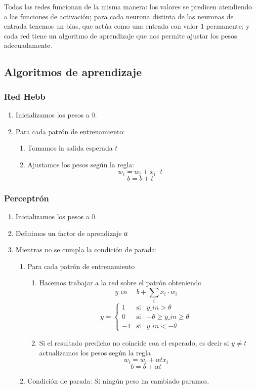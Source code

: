 Todas las redes funcionan de la misma manera: los valores se predicen atendiendo a las funciones de activación; para cada neurona distinta de las neuronas de entrada tenemos un bias, que actúa como una entrada con valor 1 permanente; y cada red tiene un algoritmo de aprendizaje que nos permite ajustar los pesos adecuadamente.

\subsection{Algoritmos de aprendizaje}
\subsubsection{Red Hebb}
\begin{enumerate}
\item Inicializamos los pesos a 0.
\item Para cada patrón de entrenamiento:
\begin{enumerate}
\item Tomamos la salida esperada $t$
\item Ajustamos los pesos según la regla:
\[w_i = w_i + x_i\cdot t\]
\[b = b + t\]
\end{enumerate}
\end{enumerate}

\subsubsection{Perceptrón}
\begin{enumerate}
\item Inicializamos los pesos a 0.
\item Definimos un factor de aprendizaje α
\item Mientras no se cumpla la condición de parada:
\begin{enumerate}
\item Para cada patrón de entrenamiento
\begin{enumerate}
\item Hacemos trabajar a la red sobre el patrón obteniendo
\[y\_in = b + \sum_i x_i\cdot w_i\]
\[y = \left\{ \begin{array}{lll}
1 & \text{si} & y\_in > \theta \\
0 & \text{si} & -\theta \geq  y\_in \geq  \theta \\
-1 & \text{si} & y\_in < -\theta
\end{array}\right.\]

\item Si el resultado predicho no coincide con el esperado, es decir si $y\neq t$ actualizamos los pesos según la regla
\[w_i = w_i + αtx_i\]
\[b = b + αt\]
\end{enumerate}
\item Condición de parada: Si ningún peso ha cambiado paramos.
\end{enumerate}
\end{enumerate}

